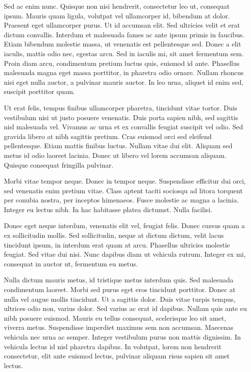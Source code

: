 \documentclass[11pt,]{article}
\begin{document}
Sed ac enim nunc. Quisque non nisi hendrerit, consectetur leo ut,
consequat ipsum. Mauris quam ligula, volutpat vel ullamcorper id,
bibendum at dolor. Praesent eget ullamcorper purus. Ut id accumsan elit.
Sed ultricies velit et erat dictum convallis. Interdum et malesuada
fames ac ante ipsum primis in faucibus. Etiam bibendum molestie massa,
ut venenatis est pellentesque sed. Donec a elit iaculis, mattis odio
nec, egestas arcu. Sed in iaculis mi, sit amet fermentum sem. Proin diam
arcu, condimentum pretium luctus quis, euismod id ante. Phasellus
malesuada magna eget massa porttitor, in pharetra odio ornare. Nullam
rhoncus nisi eget nulla auctor, a pulvinar mauris auctor. In leo urna,
aliquet id enim sed, suscipit porttitor quam.

Ut erat felis, tempus finibus ullamcorper pharetra, tincidunt vitae
tortor. Duis vestibulum nisi ut justo posuere venenatis. Duis porta
sapien nibh, sed sagittis nisl malesuada vel. Vivamus ac urna et ex
convallis feugiat suscipit vel odio. Sed gravida libero at nibh sagittis
pretium. Cras euismod orci sed eleifend pellentesque. Etiam mattis
finibus luctus. Nullam vitae dui elit. Aliquam sed metus id odio laoreet
lacinia. Donec ut libero vel lorem accumsan aliquam. Quisque consequat
fringilla pulvinar.

Morbi vitae tempor neque. Donec in tempor neque. Suspendisse efficitur
dui orci, sed venenatis enim pretium vitae. Class aptent taciti sociosqu
ad litora torquent per conubia nostra, per inceptos himenaeos. Fusce
molestie ac magna a lacinia. Integer eu lectus nibh. In hac habitasse
platea dictumst. Nulla facilisi.

Donec eget neque interdum, venenatis elit vel, feugiat felis. Donec
cursus quam a ex sollicitudin mollis. Sed sollicitudin, neque at dictum
dictum, velit lacus tincidunt ipsum, in interdum erat quam at arcu.
Phasellus ultricies molestie feugiat. Sed vitae dui nisi. Nunc dapibus
diam ut vehicula rutrum. Integer ex mi, consequat in auctor ut,
fermentum eu metus.

Nulla dictum mauris metus, id tristique metus interdum quis. Sed
malesuada condimentum laoreet. Morbi sed purus eget eros tincidunt
porttitor. Donec at nulla vel augue mollis tincidunt. Ut a sagittis
dolor. Duis vitae turpis tempus, ultrices odio non, varius dolor. Sed
varius ac erat id dapibus. Nullam quis ante eu nibh posuere euismod.
Mauris eu tellus consequat, scelerisque leo sit amet, viverra metus.
Suspendisse imperdiet maximus sem non accumsan. Maecenas vehicula nec
urna ac semper. Integer vestibulum purus non mattis dignissim. In
vehicula lectus id nisl pharetra dapibus. In volutpat, lorem non
hendrerit consectetur, elit ante euismod lectus, pulvinar aliquam risus
sapien sit amet lectus.
\end{document}
